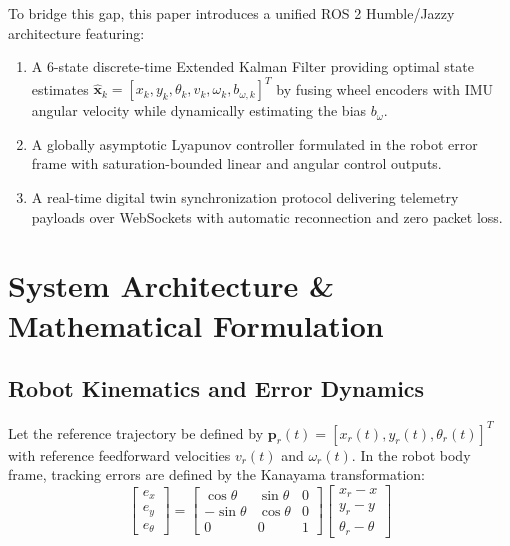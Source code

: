 \documentclass[conference]{IEEEtran}
\begin{document}
To bridge this gap, this paper introduces a unified ROS 2 Humble/Jazzy architecture featuring:
\begin{enumerate}
    \item A 6-state discrete-time Extended Kalman Filter providing optimal state estimates $\hat{\mathbf{x}}_k = [x_k, y_k, \theta_k, v_k, \omega_k, b_{\omega,k}]^T$ by fusing wheel encoders with IMU angular velocity while dynamically estimating the bias $b_\omega$.
    \item A globally asymptotic Lyapunov controller formulated in the robot error frame with saturation-bounded linear and angular control outputs.
    \item A real-time digital twin synchronization protocol delivering telemetry payloads over WebSockets with automatic reconnection and zero packet loss.
\end{enumerate}

\section{System Architecture \& Mathematical Formulation}

\subsection{Robot Kinematics and Error Dynamics}
Let the reference trajectory be defined by $\mathbf{p}_r(t) = [x_r(t), y_r(t), \theta_r(t)]^T$ with reference feedforward velocities $v_r(t)$ and $\omega_r(t)$. In the robot body frame, tracking errors are defined by the Kanayama transformation:
\begin{equation}
\begin{bmatrix} e_x \\ e_y \\ e_\theta \end{bmatrix} = 
\begin{bmatrix}
\cos\theta & \sin\theta & 0 \\
-\sin\theta & \cos\theta & 0 \\
0 & 0 & 1
\end{bmatrix}
\begin{bmatrix} x_r - x \\ y_r - y \\ \theta_r - \theta \end{bmatrix}
\end{equation}
\end{document}
